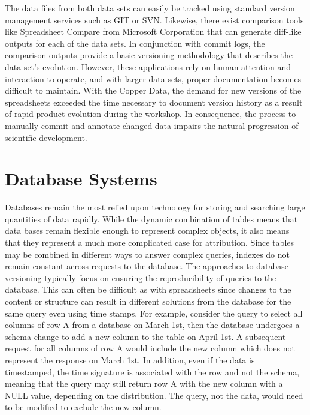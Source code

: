 The data files from both data sets can easily be tracked using standard version management services such as GIT or SVN.
Likewise, there exist comparison tools like Spreadsheet Compare from Microsoft Corporation that can generate diff-like outputs for each of the data sets.
In conjunction with commit logs, the comparison outputs provide a basic versioning methodology that describes the data set's evolution.
However, these applications rely on human attention and interaction to operate, and with larger data sets, proper documentation becomes difficult to maintain.
With the Copper Data, the demand for new versions of the spreadsheets exceeded the time necessary to document version history as a result of rapid product evolution during the workshop.
In consequence, the process to manually commit and annotate changed data impairs the natural progression of scientific development.

\section{Database Systems}

Databases remain the most relied upon technology for storing and searching large quantities of data rapidly.
While the dynamic combination of tables means that data bases remain flexible enough to represent complex objects, it also means that they represent a much more complicated case for attribution.
Since tables may be combined in different ways to answer complex queries, indexes do not remain constant across requests to the database.
The approaches to database versioning typically focus on ensuring the reproducibility of queries to the database.
This can often be difficult as with spreadsheets since changes to the content or structure can result in different solutions from the database for the same query even using time stamps.
For example, consider the query to select all columns of row A from a database on March 1st, then the database undergoes a schema change to add a new column to the table on April 1st.
A subsequent request for all columns of row A would include the new column which does not represent the response on March 1st.
In addition, even if the data is timestamped, the time signature is associated with the row and not the schema, meaning that the query may still return row A with the new column with a NULL value, depending on the distribution.
The query, not the data, would need to be modified to exclude the new column.

